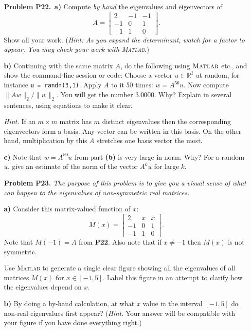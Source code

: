 \documentclass[12pt]{amsart}
\newcommand{\RR}{\mathbb{R}}
\newcommand{\Matlab}{\textsc{Matlab}\xspace}
\newcommand{\prob}[1]{\bigskip\noindent\textbf{#1}\quad }
\newcommand{\epart}[1]{\medskip\noindent\textbf{#1)}\quad }
\newcommand{\ppart}[1]{\,\textbf{#1)}\quad }
\begin{document}
\medskip
\prob{Problem P22.}  \ppart{a}  Compute \emph{by hand} the eigenvalues and eigenvectors of
    $$A = \begin{bmatrix} 2 & -1 & -1 \\
                         -1 & 0  & 1 \\
                         -1 & 1  & 0  \end{bmatrix}.$$
Show all your work.  (\emph{Hint: As you expand the determinant, watch for a factor to appear.  You may \emph{check} your work with \Matlab.})

\epart{b}  Continuing with the same matrix $A$, do the following using $\Matlab$ etc., and show the command-line session or code:  Choose a vector $u\in\RR^3$ at random, for instance \texttt{u = randn(3,1)}.  Apply $A$ to it 50 times: $w = A^{50} u$.  Now compute $\|A w\|_2/\|w\|_2$.  You will get the number $3.0000$.  Why?  Explain in several sentences, using equations to make it clear.

\medskip
\noindent \emph{Hint.}  If an $m\times m$ matrix has $m$ distinct eigenvalues then the corresponding eigenvectors form a basis.  Any vector can be written in this basis.  On the other hand, multiplication by this $A$ stretches one basis vector the most.

\epart{c}  Note that $w = A^{50} u$ from part \textbf{(b)} is very large in norm.  Why?  For a random $u$, give an estimate of the norm of the vector $A^k u$ for large $k$.


\prob{Problem P23.}  \emph{The purpose of this problem is to give you a visual sense of what can happen to the eigenvalues of non-symmetric real matrices.}

\epart{a}  Consider this matrix-valued function of $x$:
    $$M(x) = \begin{bmatrix} 2 & x & x \\
                            -1 & 0  & 1 \\
                            -1 & 1  & 0  \end{bmatrix}.$$
Note that $M(-1)=A$ from \textbf{P22}.  Also note that if $x\ne -1$ then $M(x)$ is not symmetric.

Use \Matlab to generate a single clear figure showing all the eigenvalues of all matrices $M(x)$ for $x\in [-1,5]$.  Label this figure in an attempt to clarify how the eigenvalues depend on $x$.

\epart{b}  By doing a by-hand calculation, at what $x$ value in the interval $[-1,5]$ do non-real eigenvalues first appear?  (\emph{Hint.}  Your answer will be compatible with your figure if you have done everything right.)
\end{document}
